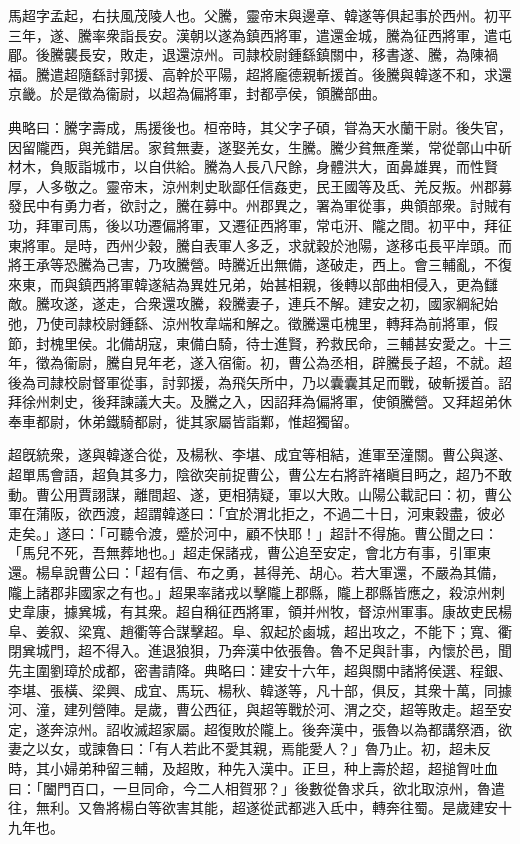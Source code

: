 
\begin{pinyinscope}
馬超字孟起，右扶風茂陵人也。父騰，靈帝末與邊章、韓遂等俱起事於西州。初平三年，遂、騰率衆詣長安。漢朝以遂為鎮西將軍，遣還金城，騰為征西將軍，遣屯郿。後騰襲長安，敗走，退還涼州。司隷校尉鍾繇鎮關中，移書遂、騰，為陳禍福。騰遣超隨繇討郭援、高幹於平陽，超將龐德親斬援首。後騰與韓遂不和，求還京畿。於是徵為衞尉，以超為偏將軍，封都亭侯，領騰部曲。

典略曰：騰字壽成，馬援後也。桓帝時，其父字子碩，甞為天水蘭干尉。後失官，因留隴西，與羌錯居。家貧無妻，遂娶羌女，生騰。騰少貧無產業，常從鄣山中斫材木，負販詣城市，以自供給。騰為人長八尺餘，身體洪大，面鼻雄異，而性賢厚，人多敬之。靈帝末，涼州刺史耿鄙任信姦吏，民王國等及氐、羌反叛。州郡募發民中有勇力者，欲討之，騰在募中。州郡異之，署為軍從事，典領部衆。討賊有功，拜軍司馬，後以功遷偏將軍，又遷征西將軍，常屯汧、隴之間。初平中，拜征東將軍。是時，西州少穀，騰自表軍人多乏，求就穀於池陽，遂移屯長平岸頭。而將王承等恐騰為己害，乃攻騰營。時騰近出無備，遂破走，西上。會三輔亂，不復來東，而與鎮西將軍韓遂結為異姓兄弟，始甚相親，後轉以部曲相侵入，更為讎敵。騰攻遂，遂走，合衆還攻騰，殺騰妻子，連兵不解。建安之初，國家綱紀始弛，乃使司隷校尉鍾繇、涼州牧韋端和解之。徵騰還屯槐里，轉拜為前將軍，假節，封槐里侯。北備胡寇，東備白騎，待士進賢，矜救民命，三輔甚安愛之。十三年，徵為衞尉，騰自見年老，遂入宿衞。初，曹公為丞相，辟騰長子超，不就。超後為司隷校尉督軍從事，討郭援，為飛矢所中，乃以囊囊其足而戰，破斬援首。詔拜徐州刺史，後拜諫議大夫。及騰之入，因詔拜為偏將軍，使領騰營。又拜超弟休奉車都尉，休弟鐵騎都尉，徙其家屬皆詣鄴，惟超獨留。

超旣統衆，遂與韓遂合從，及楊秋、李堪、成宜等相結，進軍至潼關。曹公與遂、超單馬會語，超負其多力，陰欲突前捉曹公，曹公左右將許褚瞋目眄之，超乃不敢動。曹公用賈詡謀，離間超、遂，更相猜疑，軍以大敗。山陽公載記曰：初，曹公軍在蒲阪，欲西渡，超謂韓遂曰：「宜於渭北拒之，不過二十日，河東穀盡，彼必走矣。」遂曰：「可聽令渡，蹙於河中，顧不快耶！」超計不得施。曹公聞之曰：「馬兒不死，吾無葬地也。」超走保諸戎，曹公追至安定，會北方有事，引軍東還。楊阜說曹公曰：「超有信、布之勇，甚得羌、胡心。若大軍還，不嚴為其備，隴上諸郡非國家之有也。」超果率諸戎以擊隴上郡縣，隴上郡縣皆應之，殺涼州刺史韋康，據兾城，有其衆。超自稱征西將軍，領并州牧，督涼州軍事。康故吏民楊阜、姜叙、梁寬、趙衢等合謀擊超。阜、叙起於鹵城，超出攻之，不能下；寬、衢閉兾城門，超不得入。進退狼狽，乃奔漢中依張魯。魯不足與計事，內懷於邑，聞先主圍劉璋於成都，密書請降。典略曰：建安十六年，超與關中諸將侯選、程銀、李堪、張橫、梁興、成宜、馬玩、楊秋、韓遂等，凡十部，俱反，其衆十萬，同據河、潼，建列營陣。是歲，曹公西征，與超等戰於河、渭之交，超等敗走。超至安定，遂奔涼州。詔收滅超家屬。超復敗於隴上。後奔漢中，張魯以為都講祭酒，欲妻之以女，或諫魯曰：「有人若此不愛其親，焉能愛人？」魯乃止。初，超未反時，其小婦弟种留三輔，及超敗，种先入漢中。正旦，种上壽於超，超搥胷吐血曰：「闔門百口，一旦同命，今二人相賀邪？」後數從魯求兵，欲北取涼州，魯遣往，無利。又魯將楊白等欲害其能，超遂從武都逃入氐中，轉奔往蜀。是歲建安十九年也。


\end{pinyinscope}
